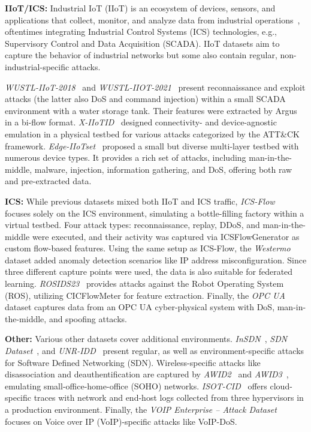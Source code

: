 \textbf{IIoT/ICS:}
Industrial IoT (IIoT) is an ecosystem of devices, sensors, and applications that collect, monitor, and analyze data from industrial operations~\cite{boyes2018_industrial_iot}, oftentimes integrating Industrial Control Systems (ICS) technologies, e.g., Supervisory Control and Data Acquisition (SCADA). IIoT datasets aim to capture the behavior of industrial networks but some also contain regular, non-industrial-specific attacks.

\emph{WUSTL-IIoT-2018}~\cite{teixeira_wustl_iiot2018} and \emph{WUSTL-IIOT-2021}~\cite{zolanvari2019_wustl_iiot2021} present reconnaissance and exploit attacks (the latter also DoS and command injection) within a small SCADA environment with a water storage tank. Their features were extracted by Argus in a bi-flow format. \emph{X-IIoTID}~\cite{alhawawreh2022_xiiotid} designed connectivity- and device-agnostic emulation in a physical testbed for various attacks categorized by the ATT\&CK framework. \emph{Edge-IIoTset}~\cite{ferrag2022_edge_iiotset} proposed a small but diverse multi-layer testbed with numerous device types. It provides a rich set of attacks, including man-in-the-middle, malware, injection, information gathering, and DoS, offering both raw and pre-extracted data.

\textbf{ICS:}
While previous datasets mixed both IIoT and ICS traffic, \emph{ICS-Flow}~\cite{deghlaghi2023_ics_flow} focuses solely on the ICS environment, simulating a bottle-filling factory within a virtual testbed. Four attack types: reconnaissance, replay, DDoS, and man-in-the-middle were executed, and their activity was captured via ICSFlowGenerator as custom flow-based features. Using the same setup as ICS-Flow, the \emph{Westermo}~\cite{strandberg2023_westermo} dataset added anomaly detection scenarios like IP address misconfiguration. Since three different capture points were used, the data is also suitable for federated learning. \emph{ROSIDS23}~\cite{degirmenci2023_rosids2023} provides attacks against the Robot Operating System (ROS), utilizing CICFlowMeter for feature extraction. Finally, the \emph{OPC UA}~\cite{pinto2020_opc_ua_dataset} dataset captures data from an OPC UA cyber-physical system with DoS, man-in-the-middle, and spoofing attacks.

\textbf{Other:}
Various other datasets cover additional environments. \emph{InSDN}~\cite{elsayed2020_insdn}, \emph{SDN Dataset}~\cite{sarica2020_sdn_dataset}, and \emph{UNR-IDD}~\cite{das2023_unridd_dataset} present regular, as well as environment-specific attacks for Software Defined Networking (SDN). Wireless-specific attacks like disassociation and deauthentification are captured by \emph{AWID2}~\cite{kolias2015_awid2_dataset} and \emph{AWID3}~\cite{chatzoglou2021_awid3_dataset}, emulating small-office-home-office (SOHO) networks. \emph{ISOT-CID}~\cite{aldribi2020_isotcid} offers cloud-specific traces with network and end-host logs collected from three hypervisors in a production environment. Finally, the \emph{VOIP Enterprise – Attack Dataset}~\cite{alvares2021_voip_enterprise_attack_dataset} focuses on Voice over IP (VoIP)-specific attacks like VoIP-DoS.

